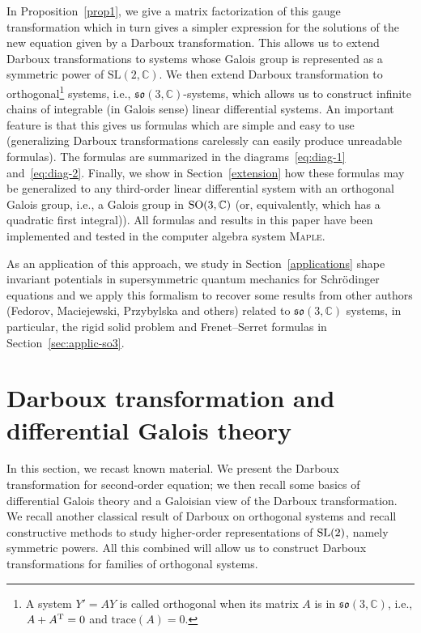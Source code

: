 \documentclass[10pt,a4paper]{amsart}
\numberwithin{equation}{section}
\begin{document}
In Proposition~\ref{prop1}, we give a matrix factorization of this gauge transformation which in turn gives a simpler expression for the solutions of the new equation given by a Darboux transformation.
 This allows us to extend Darboux transformations to systems whose Galois group is represented as a symmetric power of $\mathrm{SL}(2,\mathbb{C})$. We then extend Darboux transformation to
orthogonal\footnote{A system $Y'=AY$ is called orthogonal when its matrix $A$ is in $\mathfrak{so}(3, \mathbb{C})$, i.e., $A+A^{\rm T}=0$ and $\textrm{trace}(A)=0$.} systems, i.e., $\mathfrak{so}(3, \mathbb{C})$-systems, which allows us to construct infinite chains of integrable (in Galois sense) linear differential systems.
 An important feature is that this gives us formulas which are simple and easy to use (generalizing Darboux transformations carelessly can easily produce unreadable formulas). The formulas are summarized in the diagrams~\eqref{eq:diag-1} and~\eqref{eq:diag-2}. Finally, we show in Section~\ref{extension} how these formulas may be generalized to any third-order linear differential system with an orthogonal Galois group, i.e., a Galois group in ${\rm SO}(3, \mathbb{C})$
 (or, equivalently, which has a quadratic first integral)). All formulas and results in this paper have been implemented and tested in the computer algebra system \textsc{Maple}.

 As an application of this approach, we study in Section~\ref{applications} shape invariant potentials in supersymmetric quantum mechanics for Schr\"odinger equations and we apply this formalism to recover some results from other authors (Fedorov, Maciejewski, Przybylska and others) related to $\mathfrak{so}(3, \mathbb{C})$ systems, in particular, the rigid solid
 problem and Frenet--Serret formulas in Section~\ref{sec:applic-so3}.

\section{Darboux transformation and differential Galois theory}
In this section, we recast known material. We present the Darboux transformation for second-order equation; we then recall some basics of differential Galois theory and a Galoisian view of the Darboux transformation. We recall another classical result of Darboux on orthogonal systems and recall constructive methods to study higher-order representations of ${\rm SL}(2)$, namely symmetric powers. All this combined will allow us to construct Darboux transformations for families of orthogonal systems.
\end{document}
